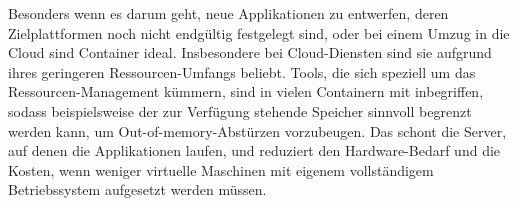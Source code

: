 Besonders wenn es darum geht, neue Applikationen zu entwerfen, deren Zielplattformen noch nicht endgültig festgelegt sind, oder bei einem Umzug in die Cloud sind Container ideal.
Insbesondere bei Cloud-Diensten sind sie aufgrund ihres geringeren Ressourcen-Umfangs beliebt.
Tools, die sich speziell um das Ressourcen-Management kümmern, sind in vielen Containern mit inbegriffen, sodass beispielsweise der zur Verfügung stehende Speicher sinnvoll begrenzt werden kann, um Out-of-memory-Abstürzen vorzubeugen. 
Das schont die Server, auf denen die Applikationen laufen, und reduziert den Hardware-Bedarf und die Kosten, wenn weniger virtuelle Maschinen mit eigenem vollständigem Betriebssystem aufgesetzt werden müssen.
\cite{12771285120180201}